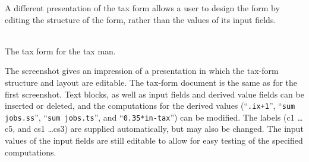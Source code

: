 \documentclass{entcs}
\begin{document}

A different presentation of the tax form allows a user to design the form by editing the structure of the form, rather than the values of its input fields.

\begin{center}
\\ [3mm]  %
{\normalsize \sf The tax form for the tax man.}
\end{center}

The screenshot gives an impression of a presentation in which the tax-form structure and layout are editable. The tax-form document is the same as for the first screenshot. Text blocks, as well as input fields and derived value fields can be inserted or deleted, and the computations for the derived values (``{\tt .ix+1}'', ``{\tt sum jobs.ss}'', ``{\tt sum jobs.ts}'', and ``{\tt 0.35*in-tax}'') can be modified. \bc The labels (c1 \dots c5, and cs1 \dots cs3) are supplied automatically, but may also be changed. \ec The input values of the input fields are still editable to allow for easy testing of the specified computations. 
\end{document}
